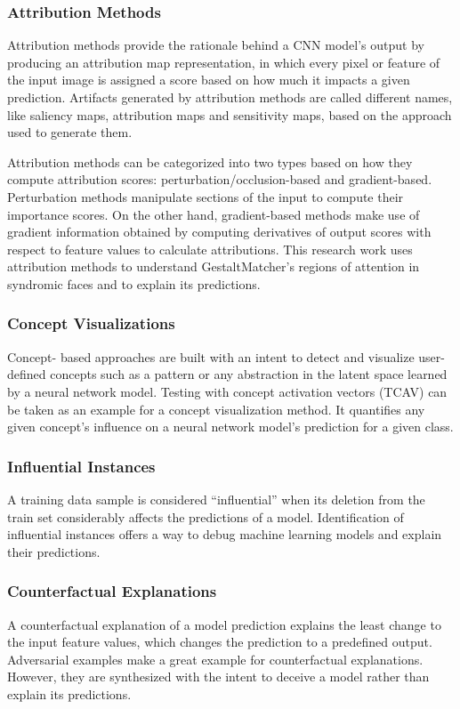 \documentclass[../report.tex]{subfiles}
\begin{document}
	\subsubsection{Attribution Methods}
	Attribution methods provide the rationale behind a CNN model's output by producing an attribution map representation, in which every pixel or feature of the input image is assigned a score based on how much it impacts a given prediction. Artifacts generated by attribution methods are called different names, like saliency maps, attribution maps and sensitivity maps, based on the approach used to generate them.
	
	Attribution methods can be categorized into two types based on how they compute attribution scores:  perturbation/occlusion-based and gradient-based. Perturbation methods manipulate sections of the input to compute their importance scores. On the other hand, gradient-based methods make use of gradient information obtained by computing derivatives of output scores with respect to feature values to calculate attributions. This research work uses attribution methods to understand GestaltMatcher's regions of attention in syndromic faces and to explain its predictions.
	\subsubsection{Concept Visualizations}
	Concept- based approaches are built with an intent to detect and visualize user-defined concepts such as a pattern or any abstraction in the latent space learned by a neural network model. Testing with concept activation vectors (TCAV) \cite{kim2018interpretability} can be taken as an example for a concept visualization method. It quantifies any given concept's influence on a neural network model's prediction for a given class.
	
	\subsubsection{Influential Instances}
	A training data sample is considered \enquote{influential} when its deletion from the train set considerably affects the predictions of a model. Identification of influential instances offers a way to debug machine learning models and explain their predictions.
	
	\subsubsection{Counterfactual Explanations}
	A counterfactual explanation of a model prediction explains the least change to the input feature values,  which changes the prediction to a predefined output. Adversarial examples \cite{goodfellow2014explaining} make a great example for counterfactual explanations. However, they are synthesized with the intent to deceive a model rather than explain its predictions.
\end{document}

